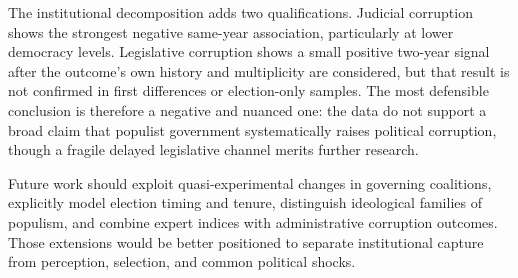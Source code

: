 The institutional decomposition adds two qualifications. Judicial corruption shows the strongest
negative same-year association, particularly at lower democracy levels. Legislative corruption shows
a small positive two-year signal after the outcome's own history and multiplicity are considered, but
that result is not confirmed in first differences or election-only samples. The most defensible
conclusion is therefore a negative and nuanced one: the data do not support a broad claim that
populist government systematically raises political corruption, though a fragile delayed legislative
channel merits further research.

Future work should exploit quasi-experimental changes in governing coalitions, explicitly model
election timing and tenure, distinguish ideological families of populism, and combine expert indices
with administrative corruption outcomes. Those extensions would be better positioned to separate
institutional capture from perception, selection, and common political shocks.

